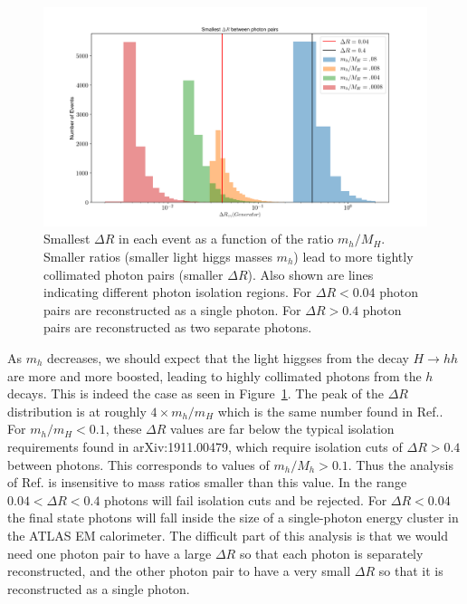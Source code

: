 \documentclass[aps,onecolumn,twoside,secnumarabic,balancelastpage,amsmath,amssymb,nofootinbib,hyperref=pdftex]{revtex4}
\begin{document}
\begin{figure}[t]
\begin{center}
\includegraphics[width=12cm]{deltaRs.png}
\caption{Smallest $\Delta R$ in each event as a function of the ratio $m_{h}/M_{H}$. Smaller ratios (smaller light higgs masses $m_{h}$) lead to more tightly collimated photon pairs (smaller $\Delta R$). Also shown are lines indicating different photon isolation regions. For $\Delta R < 0.04$ photon pairs are reconstructed as a single photon. For $\Delta R > 0.4$ photon pairs are reconstructed as two separate photons.}
\label{fig:1}
\end{center}
\end{figure}
As $m_{h}$ decreases, we should expect that the light higgses from the decay $H\rightarrow hh$ are more and more boosted, leading to highly collimated photons from the $h$ decays. This is indeed the case as seen in Figure~\ref{fig:1}. The peak of the $\Delta R$ distribution is at roughly $4\times m_{h}/m_{H}$ which is the same number found in Ref.\cite{Aaboud:2018djx}. For $m_{h}/m_{H} < 0.1$, these $\Delta R$ values are far below the typical isolation requirements found in arXiv:1911.00479, which require isolation cuts of $\Delta R > 0.4$ between photons. This corresponds to values of $m_{h}/M_{h} > 0.1$. Thus the analysis of Ref.\cite{Chawdhry:2019bji} is insensitive to mass ratios smaller than this value. 
\vskip 0.12in
In the range $0.04 < \Delta R < 0.4$ photons will fail isolation cuts and be rejected. For $\Delta R < 0.04$ the final state photons will fall inside the size of a single-photon energy cluster in the ATLAS EM calorimeter. The difficult part of this analysis is that we would need one photon pair to have a large $\Delta R$ so that each photon is separately reconstructed, and the other photon pair to have a very small $\Delta R$ so that it is reconstructed as a single photon. 
\end{document}
